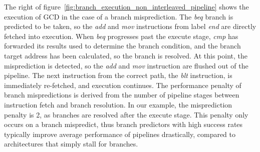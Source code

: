 The right of figure~\ref{fig:branch_execution_non_interleaved_pipeline} shows the execution of GCD in the case of a branch misprediction.
The \emph{beq} branch is predicted to be taken, so the \emph{add} and \emph{mov} instructions from label \emph{end} are directly fetched into execution. 
When \emph{beq} progresses past the execute stage, \emph{cmp} has forwarded its results used to determine the branch condition, and the branch target address has been calculated, so the branch is resolved.
At this point, the misprediction is detected, so the \emph{add} and \emph{mov} instruction are flushed out of the pipeline. 
The next instruction from the correct path, the \emph{blt} instruction, is immediately re-fetched, and execution continues.
The performance penalty of branch mispredictions is derived from the number of pipeline stages between instruction fetch and branch resolution.  
In our example, the misprediction penalty is 2, as branches are resolved after the execute stage.
This penalty only occurs on a branch mispredict, thus branch predictors with high success rates typically improve average performance of pipelines drastically, compared to architectures that simply stall for branches.

